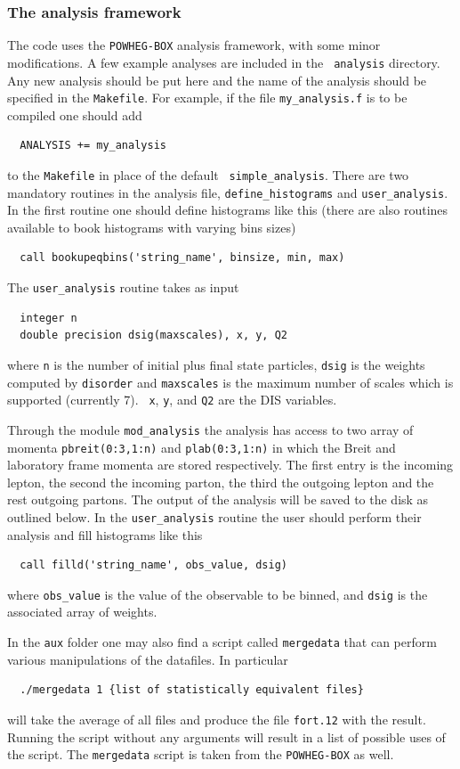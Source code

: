 \documentclass[submission, PhysCodeb]{SciPost}
\newcommand{\disorder}{{\tt disorder}}
\begin{document}
\subsubsection{The analysis framework}
The code uses the {\tt POWHEG-BOX} analysis framework, with some
minor modifications. A few example analyses are included in the {\tt
  analysis} directory. Any new analysis should be put here and the
name of the analysis should be specified in the {\tt Makefile}. For
example, if the file {\tt my\_analysis.f} is to be compiled one should
add
\begin{lstlisting}
  ANALYSIS += my_analysis
\end{lstlisting}
to the {\tt Makefile} in place of the default {\tt
  simple\_analysis}. There are two mandatory routines in the analysis
file, {\tt define\_histograms} and {\tt user\_analysis}. In the first
routine one should define histograms like this (there are also
routines available to book histograms with varying bins sizes)
\begin{lstlisting}
  call bookupeqbins('string_name', binsize, min, max)
\end{lstlisting}
The {\tt user\_analysis} routine takes as input
\begin{lstlisting}
  integer n
  double precision dsig(maxscales), x, y, Q2
\end{lstlisting}
where {\tt n} is the number of initial plus final state particles,
{\tt dsig} is the weights computed by \disorder{} and {\tt maxscales}
is the maximum number of scales which is supported (currently 7). {\tt
  x}, {\tt y}, and {\tt Q2} are the DIS variables.

Through the module {\tt mod\_analysis} the analysis has access to two
array of momenta {\tt pbreit(0:3,1:n)} and {\tt plab(0:3,1:n)} in
which the Breit and laboratory frame momenta are stored
respectively. The first entry is the incoming lepton, the second the
incoming parton, the third the outgoing lepton and the rest outgoing
partons. The output of the analysis will be saved to the disk as
outlined below.  In the {\tt user\_analysis} routine the user should
perform their analysis and fill histograms like this
\begin{lstlisting}
  call filld('string_name', obs_value, dsig)
\end{lstlisting}
where {\tt obs\_value} is the value of the observable to be binned, and
{\tt dsig} is the associated array of weights. 

In the {\tt aux} folder one may also find a
script called {\tt mergedata} that can perform various manipulations
of the datafiles. In particular
\begin{lstlisting}
  ./mergedata 1 {list of statistically equivalent files}
\end{lstlisting}
will take the average of all files and produce the file {\tt fort.12}
with the result. Running the script without any arguments will result
in a list of possible uses of the script. The {\tt mergedata} script
is taken from the {\tt POWHEG-BOX} as well.
\end{document}
